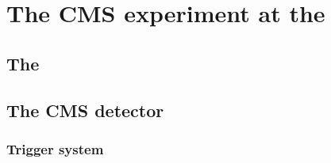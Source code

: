\chapter{The CMS experiment at the \LHC}
\label{chap:detector}


\section{The \LHC}
\label{sec:lhc}


\section{The CMS detector}
\label{sec:cms}

\subsection{Trigger system}
\label{sec:triggers}

